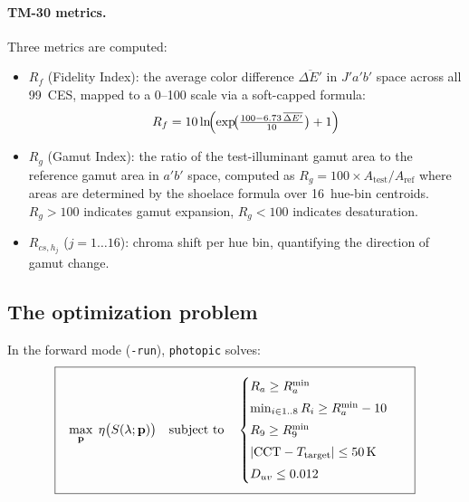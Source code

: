 \documentclass[11pt]{article}
\newcommand{\photopic}{\texttt{photopic}}
\newcommand{\cmd}[1]{\texttt{#1}}
\begin{document}
\paragraph{TM-30 metrics.}
Three metrics are computed:
\begin{itemize}
  \item $R_f$ (Fidelity Index): the average color difference $\overline{\Delta E'}$
    in $J'a'b'$ space across all 99~CES, mapped to a 0--100 scale via
    a soft-capped formula:
    \begin{equation}
      R_f = 10 \ln\!\Bigl(\exp\!\bigl(\tfrac{100 - 6.73\,\overline{\Delta E'}}{10}\bigr) + 1\Bigr)
      \label{eq:Rf}
    \end{equation}
  \item $R_g$ (Gamut Index): the ratio of the test-illuminant gamut
    area to the reference gamut area in $a'b'$ space, computed as
    $R_g = 100 \times A_{\text{test}} / A_{\text{ref}}$ where areas are
    determined by the shoelace formula over 16~hue-bin centroids.
    $R_g > 100$ indicates gamut expansion, $R_g < 100$ indicates
    desaturation.
  \item $R_{cs,h_j}$ ($j = 1 \ldots 16$): chroma shift per hue bin,
    quantifying the direction of gamut change.
\end{itemize}

\subsection{The optimization problem}

In the forward mode (\cmd{-run}), \photopic{} solves:
\begin{equation}
\fboxsep=8pt
\boxed{\;
  \max_{\mathbf{p}} \; \eta\bigl(S(\lambda; \mathbf{p})\bigr)
  \quad \text{subject to} \quad
  \begin{cases}
    R_a \geq R_a^{\min} \\[3pt]
    \min_{i \in 1..8} R_i \geq R_a^{\min} - 10 \\[3pt]
    R_9 \geq R_9^{\min} \\[3pt]
    |\text{CCT} - T_{\text{target}}| \leq 50\,\text{K} \\[3pt]
    D_{uv} \leq 0.012
  \end{cases}
\;}
  \label{eq:forward}
\end{equation}
\end{document}

